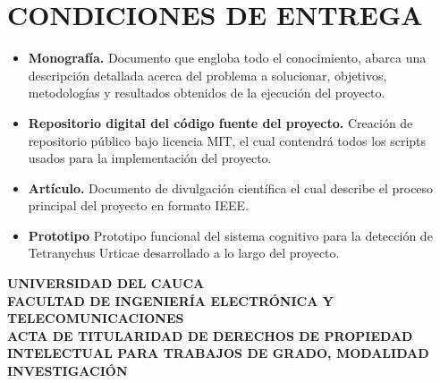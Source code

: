 \documentclass[12pt,letterpaper]{article}
\begin{document}

\section{CONDICIONES DE ENTREGA}


\begin{itemize}
    \item \textbf{Monografía.} Documento que engloba todo el conocimiento, abarca una descripción detallada acerca del problema a solucionar, objetivos, metodologías y resultados obtenidos de la ejecución del proyecto. 
    \item \textbf{Repositorio digital del código fuente del proyecto.} Creación de repositorio público bajo licencia MIT, el cual contendrá todos los scripts usados para la implementación del proyecto.
    \item \textbf{Artículo.} Documento de divulgación científica el cual describe el proceso principal del proyecto en formato IEEE.
    \item \textbf{Prototipo} Prototipo funcional del sistema cognitivo para la detección de Tetranychus Urticae desarrollado a lo largo del proyecto.
\end{itemize}


\renewcommand*{\bibfont}{\small}
\printbibliography[title={REFERENCIAS}]

\newpage
\thispagestyle{empty} %

\begin{center}
    \textbf{UNIVERSIDAD DEL CAUCA} \\
    \textbf{FACULTAD DE INGENIERÍA ELECTRÓNICA Y TELECOMUNICACIONES} \\
    \vspace{1.5cm}
    \textbf{ACTA DE TITULARIDAD DE DERECHOS DE PROPIEDAD INTELECTUAL PARA TRABAJOS DE GRADO, MODALIDAD INVESTIGACIÓN}
\end{center}

\vspace{1cm}
\end{document}
